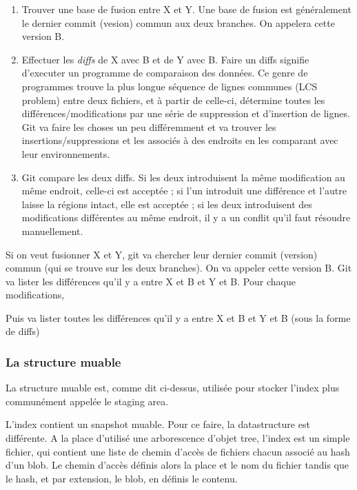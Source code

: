 \documentclass[a4paper, 12pt]{article}
\begin{document}
    \begin{enumerate}
        \item Trouver une base de fusion entre X et Y. Une base de fusion est
        généralement le dernier commit (vesion) commun aux deux branches. On
        appelera cette version B.
        \item Effectuer les \textit{diffs} de X avec B et de Y avec B. Faire un
        diffs signifie d'executer un programme de comparaison des données. Ce
        genre de programmes trouve la plus longue séquence de lignes communes
        (LCS problem) entre deux fichiers, et à partir de celle-ci, détermine
        toutes les différences/modifications par une série de suppression et
        d'insertion de lignes. Git va faire les choses un peu différemment et
        va trouver les insertions/suppressions et les associés à des endroits en
        les comparant avec leur environnements.
        \item Git compare les deux diffs. Si les deux introduisent la même
        modification au même endroit, celle-ci est acceptée ; si l'un introduit 
        une différence et l'autre laisse la régions intact, elle est acceptée ; 
        si les deux introduisent des modifications différentes au même endroit,
        il y a un conflit qu'il faut résoudre manuellement.
        

    \end{enumerate}

    Si on veut fusionner X et Y, git va chercher leur dernier commit
    (version) commun (qui se trouve sur les deux branches). On va appeler cette
    version B. Git va lister les différences qu'il y a entre X et B et Y et B.
    Pour chaque modifications, 
    
    Puis va lister toutes les différences qu'il y a entre X et B et
    Y et B (sous la forme de diffs)  

    \subsubsection{La structure muable}\label{ss:stagingarea}

    La structure muable est, comme dit ci-dessus, utilisée pour stocker l'index 
    plus communément appelée le staging area.

    L'index contient un snapshot muable. Pour ce faire, la datastructure est
    différente. A la place d'utilisé une arborescence d'objet tree, l'index est
    un simple fichier, qui contient une liste de chemin d'accès de fichiers
    chacun associé au hash d'un blob. Le chemin d'accès définis alors la
    place et le nom du fichier tandis que le hash, et par extension, le blob, en
    définis le contenu.
\end{document}
